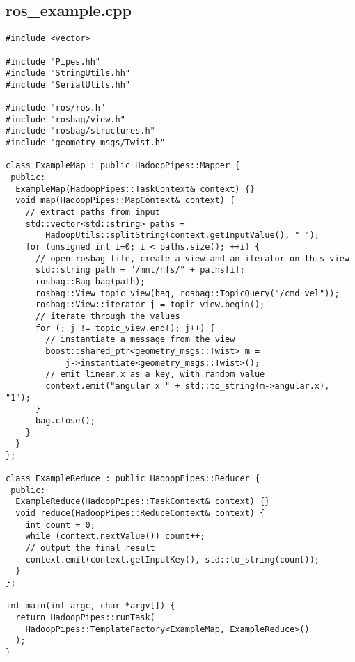 \documentclass[a4paper, 12pt]{article}
\begin{document}
\begin{appendices}
  \newpage
  \section{ros\_example.cpp}
  \label{valuecount}

\begin{lstlisting}[style=cpp]
#include <vector>

#include "Pipes.hh"
#include "StringUtils.hh"
#include "SerialUtils.hh"

#include "ros/ros.h"
#include "rosbag/view.h"
#include "rosbag/structures.h"
#include "geometry_msgs/Twist.h"

class ExampleMap : public HadoopPipes::Mapper {
 public:
  ExampleMap(HadoopPipes::TaskContext& context) {}
  void map(HadoopPipes::MapContext& context) {
    // extract paths from input
    std::vector<std::string> paths = 
        HadoopUtils::splitString(context.getInputValue(), " ");
    for (unsigned int i=0; i < paths.size(); ++i) {
      // open rosbag file, create a view and an iterator on this view
      std::string path = "/mnt/nfs/" + paths[i];
      rosbag::Bag bag(path);
      rosbag::View topic_view(bag, rosbag::TopicQuery("/cmd_vel"));
      rosbag::View::iterator j = topic_view.begin();
      // iterate through the values
      for (; j != topic_view.end(); j++) {
        // instantiate a message from the view
        boost::shared_ptr<geometry_msgs::Twist> m =
            j->instantiate<geometry_msgs::Twist>();
        // emit linear.x as a key, with random value
        context.emit("angular x " + std::to_string(m->angular.x), "1");
      }
      bag.close();
    }
  }
};

class ExampleReduce : public HadoopPipes::Reducer {
 public:
  ExampleReduce(HadoopPipes::TaskContext& context) {}
  void reduce(HadoopPipes::ReduceContext& context) {
    int count = 0;
    while (context.nextValue()) count++;
    // output the final result
    context.emit(context.getInputKey(), std::to_string(count));
  }
};

int main(int argc, char *argv[]) {
  return HadoopPipes::runTask(
    HadoopPipes::TemplateFactory<ExampleMap, ExampleReduce>()
  );
}
\end{lstlisting}

\end{appendices}

\newpage
{}
\printbibliography
\end{document}
